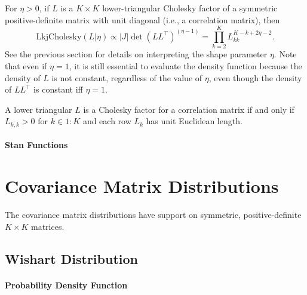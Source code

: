\begin{description}
{For $\eta > 0$, if $L$ is a $K \times K$ lower-triangular Cholesky factor of a symmetric positive-definite matrix with unit diagonal (i.e., a correlation matrix), then \[ \text{LkjCholesky}(L|\eta) \propto \left|J\right|\det(L L^\top)^{(\eta - 1)} = \prod_{k=2}^K L_{kk}^{K-k+2\eta-2}. \] See the previous section for details on interpreting the shape parameter $\eta$. Note that even if $\eta=1$, it is still essential to evaluate the density function because the density of $L$ is not constant, regardless of the value of $\eta$, even though the density of $LL^\top$ is constant iff $\eta=1$.


A lower triangular $L$ is a Cholesky factor for a correlation matrix if and only if $L_{k,k} > 0$ for $k \in 1{:}K$ and each row $L_k$ has unit Euclidean length.




\subsubsection{Stan Functions}


\begin{description}    \end{description}


\begin{description}  \end{description}


\chapter{Covariance Matrix Distributions}


The covariance matrix distributions have support on symmetric, positive-definite $K \times K$ matrices.


\section{Wishart Distribution}


\subsubsection{Probability Density Function}


}
\end{description}
